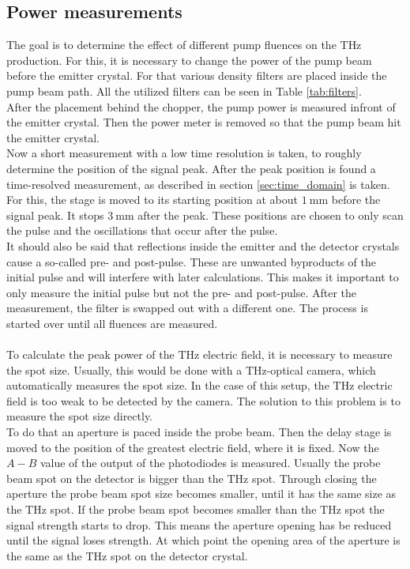 \subsection{Power measurements}
\label{sec:power}
The goal is to determine the effect of different pump fluences on the $\si{\tera\hertz}$ production.
For this, it is necessary to change the power of the pump beam before the emitter crystal.
For that various density filters are placed inside the pump beam path.
All the utilized filters can be seen in Table \ref{tab:filters}.
\\
After the placement behind the chopper, the pump power is measured infront of the emitter crystal.
Then the power meter is removed so that the pump beam hit the emitter crystal.
\\
Now a short measurement with a low time resolution is taken, to roughly determine the position of the signal peak.
After the peak position is found a time-resolved measurement, as described in section \ref{sec:time_domain} is taken.
For this, the stage is moved to its starting position at about $\SI{1}{\milli\meter}$ before the signal peak.
It stops $\SI{3}{\milli\meter}$ after the peak.
These positions are chosen to only scan the pulse and the oscillations that occur after the pulse.
\\
It should also be said that reflections inside the emitter and the detector crystals cause a so-called pre- and post-pulse.
These are unwanted byproducts of the initial pulse and will interfere with later calculations.
This makes it important to only measure the initial pulse but not the pre- and post-pulse.
After the measurement, the filter is swapped out with a different one.
The process is started over until all fluences are measured.
\\\\
To calculate the peak power of the $\si{\tera\hertz}$ electric field, it is necessary to measure the spot size.
Usually, this would be done with a $\si{\tera\hertz}$-optical camera, which automatically measures the spot size.
In the case of this setup, the $\si{\tera\hertz}$ electric field is too weak to be detected by the camera.
The solution to this problem is to measure the spot size directly.
\\
To do that an aperture is paced inside the probe beam.
Then the delay stage is moved to the position of the greatest electric field, where it is fixed.
Now the $A-B$ value of the output of the photodiodes is measured.
Usually the probe beam spot on the detector is bigger than the $\si{\tera\hertz}$ spot.
Through closing the aperture the probe beam spot size becomes smaller, until it has the same size as the $\si{\tera\hertz}$ spot.
If the probe beam spot becomes smaller than the $\si{\tera\hertz}$ spot the signal strength starts to drop.
This means the aperture opening has be reduced until the signal loses strength. 
At which point the opening area of the aperture is the same as the $\si{\tera\hertz}$ spot on the detector crystal.
